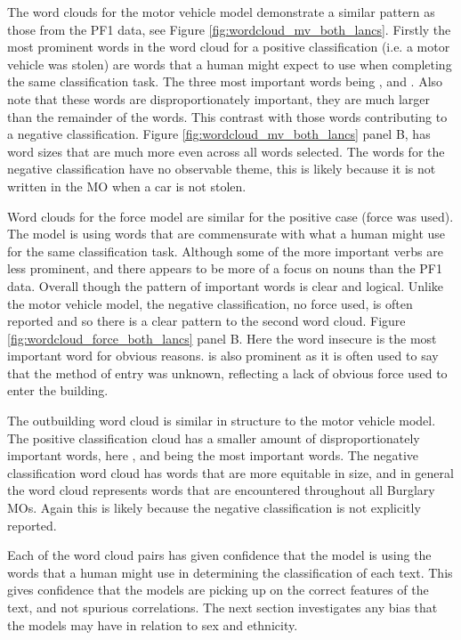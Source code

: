 The word clouds for the motor vehicle model demonstrate a similar pattern as those from the PF1 data, see Figure \ref{fig:wordcloud_mv_both_lancs}. Firstly the most prominent words in the word cloud for a positive classification (i.e. a motor vehicle was stolen) are words that a human might expect to use when completing the same classification task. The three most important words being ,  and . Also note that these words are disproportionately important, they are much larger than the remainder of the words. This contrast with those words contributing to a negative classification. Figure \ref{fig:wordcloud_mv_both_lancs} panel B, has word sizes that are much more even across all words selected. The words for the negative classification have no observable theme, this is likely because it is not written in the MO when a car is not stolen.

Word clouds for the force model are similar for the positive case (force was used). The model is using words that are commensurate with what a human might use for the same classification task. Although some of the more important verbs are less prominent, and there appears to be more of a focus on nouns than the PF1 data. Overall though the pattern of important words is clear and logical. Unlike the motor vehicle model, the negative classification, no force used, is often reported and so there is a clear pattern to the second word cloud. Figure \ref{fig:wordcloud_force_both_lancs} panel B. Here the word insecure is the most important word for obvious reasons.  is also prominent as it is often used to say that the method of entry was unknown, reflecting a lack of obvious force used to enter the building. 

The outbuilding word cloud is similar in structure to the motor vehicle model. The positive classification cloud has a smaller amount of disproportionately important words, here ,  and  being the most important words. The negative classification word cloud has words that are more equitable in size, and in general the word cloud represents words that are encountered throughout all Burglary MOs. Again this is likely because the  negative classification is not explicitly reported.

Each of the word cloud pairs has given confidence that the model is using the words that a human might use in determining the classification of each text. This gives confidence that the models are picking up on the correct features of the text, and not spurious correlations. The next section investigates any bias that the models may have in relation to sex and ethnicity.

